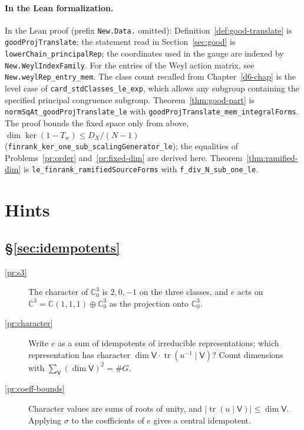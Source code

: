\documentclass[reqno]{amsart}
\newcounter{chap}
\theoremstyle{definition}
\theoremstyle{plain}
\theoremstyle{definition}
\newcommand{\C}{\mathbb{C}}
\newcommand{\tl}[1]{\texttt{#1}}
\begin{document}
\paragraph{In the Lean formalization.}
{\raggedright In the Lean proof \cite{GL} (prefix \tl{New.Data.} omitted): Definition~\ref{def:good-translate} is \tl{goodProjTranslate}; the statement read in Section~\ref{sec:good} is \tl{lowerChain\_principalRep}; the coordinates used in the gauge are indexed by \tl{New.WeylIndexFamily}.  For the entries of the Weyl action matrix, see \tl{New.weylRep\_entry\_mem}.  The class count recalled from Chapter~\ref{d6-chap} is the level case of \tl{card\_stdClasses\_le\_exp}, which allows any subgroup containing the specified principal congruence subgroup.  Theorem~\ref{thm:good-part} is \tl{normSqAt\_goodProjTranslate\_le} with \tl{goodProjTranslate\_mem\_integralForms}.  The proof bounds the fixed space only from above, \(\dim\ker(1 - T_w) \le D_X/(N - 1)\) (\tl{finrank\_ker\_one\_sub\_scalingGenerator\_le}); the equalities of Problems~\ref{pr:order} and~\ref{pr:fixed-dim} are derived here.  Theorem~\ref{thm:ramified-dim} is \tl{le\_finrank\_ramifiedSourceForms} with \tl{f\_div\_N\_sub\_one\_le}.\par}

\section*{Hints}

\subsection*{\S\ref{sec:idempotents}}
\begin{description}
\item[\ref{pr:s3}] The character of \(\C^3_0\) is \(2, 0, -1\) on the three classes, and \(e\) acts on \(\C^3 = \C(1,1,1) \oplus \C^3_0\) as the projection onto \(\C^3_0\).
\item[\ref{pr:character}] Write \(e\) as a sum of idempotents of irreducible representations; which representation has character \(\dim\mathsf V\cdot\operatorname{tr}(u^{-1}\mid\mathsf V)\)?  Count dimensions with \(\sum_{\mathsf V}(\dim\mathsf V)^2 = \#G\).
\item[\ref{pr:coeff-bounds}] Character values are sums of roots of unity, and \(\lvert\operatorname{tr}(u\mid\mathsf V)\rvert \le \dim\mathsf V\).  Applying \(\sigma\) to the coefficients of \(e\) gives a central idempotent.
\end{description}
\end{document}
